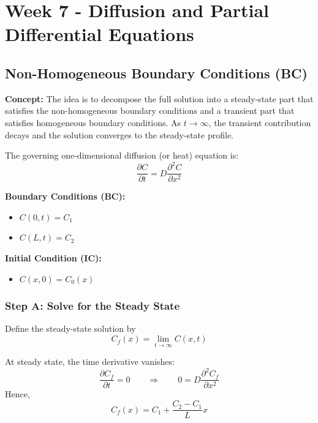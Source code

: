 \section{Week 7 - Diffusion and Partial Differential Equations}

\subsection{Non-Homogeneous Boundary Conditions (BC)}

\textbf{Concept:} The idea is to decompose the full solution into a steady-state part that satisfies the non-homogeneous boundary conditions and a transient part that satisfies homogeneous boundary conditions. As $t \to \infty$, the transient contribution decays and the solution converges to the steady-state profile.

The governing one-dimensional diffusion (or heat) equation is:
\begin{equation}
    \frac{\partial C}{\partial t} = D \frac{\partial^2 C}{\partial x^2}
\end{equation}

\textbf{Boundary Conditions (BC):}
\begin{itemize}
    \item $C(0,t)=C_1$
    \item $C(L,t)=C_2$
\end{itemize}

\textbf{Initial Condition (IC):}
\begin{itemize}
    \item $C(x,0)=C_0(x)$
\end{itemize}

\subsubsection{Step A: Solve for the Steady State}

Define the steady-state solution by
\begin{equation}
    C_f(x)=\lim_{t\to\infty} C(x,t)
\end{equation}

At steady state, the time derivative vanishes:
\begin{equation}
    \frac{\partial C_f}{\partial t}=0
    \qquad \Longrightarrow \qquad
    0 = D\frac{\partial^2 C_f}{\partial x^2}
\end{equation}
Hence,
\begin{equation}
    C_f(x)=C_1+\frac{C_2-C_1}{L}x
\end{equation}

